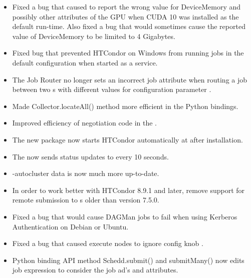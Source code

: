 \begin{itemize}

\item Fixed a bug that caused  to report the wrong value
for DeviceMemory and possibly other attributes of the GPU when CUDA 10 was
installed as the default run-time.  Also fixed a bug that would sometimes cause
the reported value of DeviceMemory to be limited to 4 Gigabytes.

\item Fixed bug that prevented HTCondor on Windows from running jobs in the
default configuration when started as a service.

\item The Job Router no longer sets an incorrect  job
attribute when routing a job between two s with
different values for configuration parameter .

\item Made Collector.locateAll() method more efficient in the Python
bindings.

\item Improved efficiency of negotiation code in the .

\item The new  package now starts HTCondor automatically
at after installation.

\item The  now sends status updates to  every 10
seconds.

\item {} -autocluster data is now much more up-to-date.

\item In order to work better with HTCondor 8.9.1 and later, remove support
for remote submission to s older than version 7.5.0.

\item Fixed a bug that would cause DAGMan jobs to fail when using Kerberos Authentication on Debian or Ubuntu.

\item Fixed a bug that caused execute nodes to ignore config knob .

\item Python binding API method Schedd.submit() and submitMany() now edits job 
expression to consider the job ad's  and  attributes.

\end{itemize}


